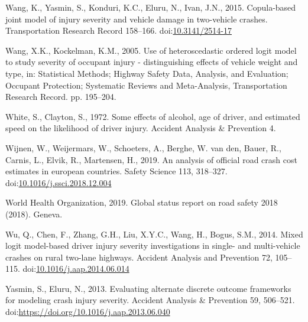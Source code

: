 \documentclass[]{elsarticle} %
\begin{document}
\leavevmode\hypertarget{ref-Wang2015copula}{}%
Wang, K., Yasmin, S., Konduri, K.C., Eluru, N., Ivan, J.N., 2015.
Copula-based joint model of injury severity and vehicle damage in
two-vehicle crashes. Transportation Research Record 158--166.
doi:\href{https://doi.org/10.3141/2514-17}{10.3141/2514-17}

\leavevmode\hypertarget{ref-Wang2005use}{}%
Wang, X.K., Kockelman, K.M., 2005. Use of heteroscedastic ordered logit
model to study severity of occupant injury - distinguishing effects of
vehicle weight and type, in: Statistical Methods; Highway Safety Data,
Analysis, and Evaluation; Occupant Protection; Systematic Reviews and
Meta-Analysis, Transportation Research Record. pp. 195--204.

\leavevmode\hypertarget{ref-White1972effects}{}%
White, S., Clayton, S., 1972. Some effects of alcohol, age of driver,
and estimated speed on the likelihood of driver injury. Accident
Analysis \& Prevention 4.

\leavevmode\hypertarget{ref-Wijnen2019analysis}{}%
Wijnen, W., Weijermars, W., Schoeters, A., Berghe, W. van den, Bauer,
R., Carnis, L., Elvik, R., Martensen, H., 2019. An analysis of official
road crash cost estimates in european countries. Safety Science 113,
318--327.
doi:\href{https://doi.org/10.1016/j.ssci.2018.12.004}{10.1016/j.ssci.2018.12.004}

\leavevmode\hypertarget{ref-WHO2019global}{}%
World Health Organization, 2019. Global status report on road safety
2018 (2018). Geneva.

\leavevmode\hypertarget{ref-Wu2014mixed}{}%
Wu, Q., Chen, F., Zhang, G.H., Liu, X.Y.C., Wang, H., Bogus, S.M., 2014.
Mixed logit model-based driver injury severity investigations in single-
and multi-vehicle crashes on rural two-lane highways. Accident Analysis
and Prevention 72, 105--115.
doi:\href{https://doi.org/10.1016/j.aap.2014.06.014}{10.1016/j.aap.2014.06.014}

\leavevmode\hypertarget{ref-Shamsunnahar2013evaluating}{}%
Yasmin, S., Eluru, N., 2013. Evaluating alternate discrete outcome
frameworks for modeling crash injury severity. Accident Analysis \&
Prevention 59, 506--521.
doi:\href{https://doi.org/https://doi.org/10.1016/j.aap.2013.06.040}{https://doi.org/10.1016/j.aap.2013.06.040}
\end{document}
